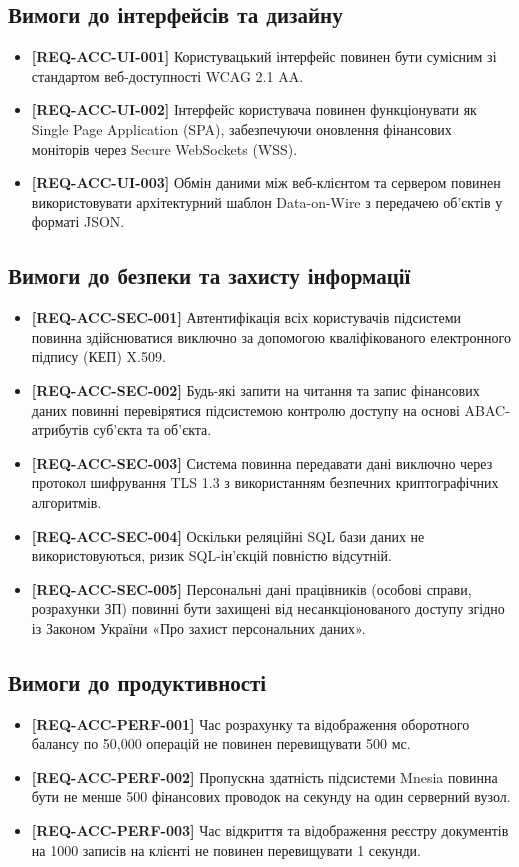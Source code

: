 \documentclass{article}
\begin{document}
\subsection{Вимоги до інтерфейсів та дизайну}
\begin{itemize}
    \item \textbf{[REQ-ACC-UI-001]} Користувацький інтерфейс повинен бути сумісним зі стандартом веб-доступності WCAG 2.1 AA.
    \item \textbf{[REQ-ACC-UI-002]} Інтерфейс користувача повинен функціонувати як Single Page Application (SPA), забезпечуючи оновлення фінансових моніторів через Secure WebSockets (WSS).
    \item \textbf{[REQ-ACC-UI-003]} Обмін даними між веб-клієнтом та сервером повинен використовувати архітектурний шаблон Data-on-Wire з передачею об'єктів у форматі JSON.
\end{itemize}

\subsection{Вимоги до безпеки та захисту інформації}
\begin{itemize}
    \item \textbf{[REQ-ACC-SEC-001]} Автентифікація всіх користувачів підсистеми повинна здійснюватися виключно за допомогою кваліфікованого електронного підпису (КЕП) X.509.
    \item \textbf{[REQ-ACC-SEC-002]} Будь-які запити на читання та запис фінансових даних повинні перевірятися підсистемою контролю доступу на основі ABAC-атрибутів суб'єкта та об'єкта.
    \item \textbf{[REQ-ACC-SEC-003]} Система повинна передавати дані виключно через протокол шифрування TLS 1.3 з використанням безпечних криптографічних алгоритмів.
    \item \textbf{[REQ-ACC-SEC-004]} Оскільки реляційні SQL бази даних не використовуються, ризик SQL-ін'єкцій повністю відсутній.
    \item \textbf{[REQ-ACC-SEC-005]} Персональні дані працівників (особові справи, розрахунки ЗП) повинні бути захищені від несанкціонованого доступу згідно із Законом України «Про захист персональних даних».
\end{itemize}

\subsection{Вимоги до продуктивності}
\begin{itemize}
    \item \textbf{[REQ-ACC-PERF-001]} Час розрахунку та відображення оборотного балансу по 50,000 операцій не повинен перевищувати 500 мс.
    \item \textbf{[REQ-ACC-PERF-002]} Пропускна здатність підсистеми Mnesia повинна бути не менше 500 фінансових проводок на секунду на один серверний вузол.
    \item \textbf{[REQ-ACC-PERF-003]} Час відкриття та відображення реєстру документів на 1000 записів на клієнті не повинен перевищувати 1 секунди.
\end{itemize}
\end{document}
